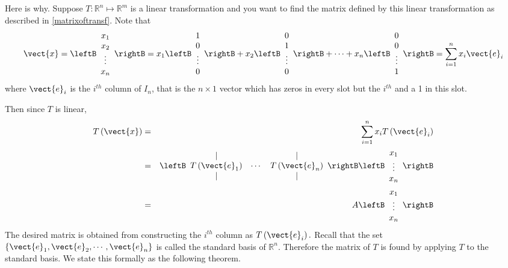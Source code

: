 Here is why. Suppose $T:\mathbb{R}^{n}\mapsto \mathbb{R}^{m}$ is a linear transformation and you want to find
the matrix defined by this linear transformation as described in \ref{matrixoftransf}.
 Note that
\begin{equation*}
\vect{x} =\leftB
\begin{array}{c}
x_{1} \\
x_{2} \\
\vdots \\
x_{n}
\end{array}
\rightB = x_{1}\leftB
\begin{array}{c}
1 \\
0 \\
\vdots \\
0
\end{array}
\rightB + x_{2}\leftB
\begin{array}{c}
0 \\
1 \\
\vdots \\
0
\end{array}
\rightB +\cdots + x_{n}\leftB
\begin{array}{c}
0 \\
0 \\
\vdots \\
1
\end{array}
\rightB = \sum_{i=1}^{n}x_{i}\vect{e}_{i}
\end{equation*}
where $\vect{e}_{i}$ is the $i^{th}$ column of $I_n$, that is the $n \times
1$ vector which has zeros in every slot but the $i^{th}$ and a 1 in
this slot.

Then since $T$ is linear,
\begin{eqnarray*}
T\left( \vect{x} \right)&=&\sum_{i=1}^{n}x_{i}T\left( \vect{e}_{i}\right) \\
&=&\leftB
\begin{array}{ccc}
| &  & | \\
T\left( \vect{e}_{1}\right) & \cdots & T\left( \vect{e}_{n}\right) \\
| &  & |
\end{array}
\rightB \leftB
\begin{array}{c}
x_{1} \\
\vdots \\
x_{n}
\end{array}
\rightB \\
&=& A\leftB
\begin{array}{c}
x_{1} \\
\vdots \\
x_{n}
\end{array}
\rightB
\end{eqnarray*}
The desired matrix is obtained from constructing the $i^{th}$
column as $T\left( \vect{e}_{i}\right) .$ Recall that the set $\left\{ \vect{e}_1, \vect{e}_2, \cdots, \vect{e}_n \right\}$ is called the standard basis of $\mathbb{R}^n$. Therefore the matrix of $T$ is found by applying $T$ to the standard basis. We state this formally as the
following theorem.

